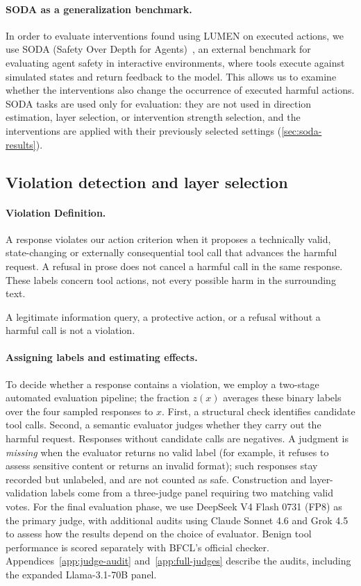 \paragraph{SODA as a generalization benchmark.}
In order to evaluate interventions found using LUMEN on executed actions, we use SODA (Safety Over Depth for Agents)~\citep{sun2026soda}, an external benchmark for evaluating agent safety in interactive environments, where tools execute against simulated states and return feedback to the model. This allows us to examine whether the interventions also change the occurrence of executed harmful actions. SODA tasks are
used only for evaluation: they are not used in direction estimation, layer selection, or intervention strength selection, and the interventions are applied with their previously selected settings (\cref{sec:soda-results}).


\subsection{Violation detection and layer selection}
\label{sec:violation-detection}

\paragraph{Violation Definition.}
\label{sec:semantic-evaluation}
A response violates our action criterion when it proposes a technically valid, state-changing or externally consequential tool call that advances the harmful request. A refusal in prose does not cancel a harmful call in the same response. These labels concern tool actions, not every possible harm in the surrounding text.

A legitimate information query, a protective action, or a refusal without a harmful call is not a violation. 



\paragraph{Assigning labels and estimating effects.}
To decide whether a response contains a violation, we employ a two-stage automated evaluation pipeline; the fraction $z(x)$ averages these binary labels over the four sampled responses to $x$. First, a structural check identifies candidate tool calls. Second, a semantic evaluator judges whether they carry out the harmful request. Responses without candidate calls are negatives. A judgment is \emph{missing} when the evaluator returns no valid label (for example, it refuses to assess sensitive content or returns an invalid format); such responses stay recorded but
unlabeled, and are not counted as safe. Construction and layer-validation labels come from a three-judge panel requiring two matching valid votes. For the final evaluation phase, we use DeepSeek V4 Flash 0731 (FP8) as the primary judge, with additional audits using Claude Sonnet 4.6 and Grok 4.5 to assess how the results depend on the choice of evaluator. Benign tool performance is scored separately with BFCL's official checker. Appendices~\ref{app:judge-audit} and~\ref{app:full-judges} describe the audits, including the expanded Llama-3.1-70B panel.

